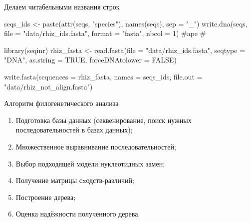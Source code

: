 \documentclass[
  ignorenonframetext,
  russian,
]{beamer}
\newenvironment{Shaded}{\begin{snugshade}}{\end{snugshade}}
\newcommand{\AttributeTok}[1]{\textcolor[rgb]{0.40,0.45,0.13}{#1}}
\newcommand{\CommentTok}[1]{\textcolor[rgb]{0.37,0.37,0.37}{#1}}
\newcommand{\ConstantTok}[1]{\textcolor[rgb]{0.56,0.35,0.01}{#1}}
\newcommand{\DecValTok}[1]{\textcolor[rgb]{0.68,0.00,0.00}{#1}}
\newcommand{\FunctionTok}[1]{\textcolor[rgb]{0.28,0.35,0.67}{#1}}
\newcommand{\NormalTok}[1]{\textcolor[rgb]{0.00,0.23,0.31}{#1}}
\newcommand{\OtherTok}[1]{\textcolor[rgb]{0.00,0.23,0.31}{#1}}
\newcommand{\StringTok}[1]{\textcolor[rgb]{0.13,0.47,0.30}{#1}}
\begin{document}
\begin{frame}[fragile]{Делаем читабельными названия строк}
\protect{}\label{ux434ux435ux43bux430ux435ux43c-ux447ux438ux442ux430ux431ux435ux43bux44cux43dux44bux43cux438-ux43dux430ux437ux432ux430ux43dux438ux44f-ux441ux442ux440ux43eux43a}
\begin{Shaded}
\begin{Highlighting}[]
\NormalTok{seqs\_ids }\OtherTok{\textless{}{-}} \FunctionTok{paste}\NormalTok{(}\FunctionTok{attr}\NormalTok{(seqs, }\StringTok{"species"}\NormalTok{), }\FunctionTok{names}\NormalTok{(seqs), }\AttributeTok{sep =} \StringTok{"\_"}\NormalTok{)}
\FunctionTok{write.dna}\NormalTok{(seqs, }\AttributeTok{file =} \StringTok{"data/rhiz\_ids.fasta"}\NormalTok{, }\AttributeTok{format =} \StringTok{"fasta"}\NormalTok{, }\AttributeTok{nbcol =} \DecValTok{1}\NormalTok{) }\CommentTok{\#ape}
\CommentTok{\#}

\FunctionTok{library}\NormalTok{(seqinr)}
\NormalTok{rhiz\_fasta }\OtherTok{\textless{}{-}} \FunctionTok{read.fasta}\NormalTok{(}\AttributeTok{file =} \StringTok{"data/rhiz\_ids.fasta"}\NormalTok{, }\AttributeTok{seqtype =} \StringTok{"DNA"}\NormalTok{,}
           \AttributeTok{as.string =} \ConstantTok{TRUE}\NormalTok{, }\AttributeTok{forceDNAtolower =} \ConstantTok{FALSE}\NormalTok{)}

\FunctionTok{write.fasta}\NormalTok{(}\AttributeTok{sequences =}\NormalTok{ rhiz\_fasta, }\AttributeTok{names =}\NormalTok{ seqs\_ids, }\AttributeTok{file.out =} \StringTok{"data/rhiz\_not\_align.fasta"}\NormalTok{)}
\end{Highlighting}
\end{Shaded}
\end{frame}

\begin{frame}{Алгоритм филогенетического анализа}
\protect{}\label{ux430ux43bux433ux43eux440ux438ux442ux43c-ux444ux438ux43bux43eux433ux435ux43dux435ux442ux438ux447ux435ux441ux43aux43eux433ux43e-ux430ux43dux430ux43bux438ux437ux430}
\begin{enumerate}
\item
  Подготовка базы данных (секвенирование, поиск нужных
  последовательностей в базах данных);
\item
  Множественное выравнивание последовательностей;
\item
  Выбор подходящей модели нуклеотидных замен;
\item
  Получение матрицы сxодств-различий;
\item
  Построение дерева;
\item
  Оценка надёжности полученного дерева.
\end{enumerate}
\end{frame}
\end{document}
